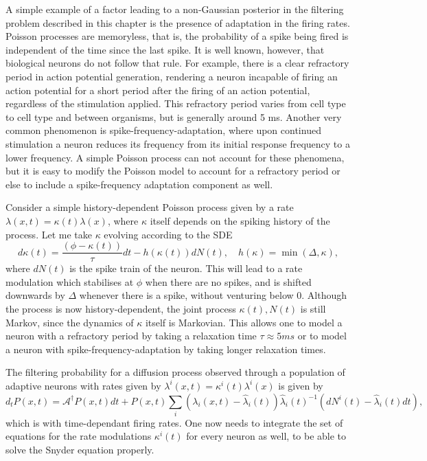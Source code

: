 {A simple example of a factor leading to a non-Gaussian posterior in the filtering problem described in this chapter is the presence of adaptation in the firing rates. Poisson processes 
are memoryless,
that is, the probability of a spike being fired is independent of the time since the last spike. It is well known, however, that biological neurons do not follow that rule. For example,
there is a clear refractory period in action potential generation, rendering a neuron incapable of firing an action potential for a short period after the firing of an action potential, 
regardless of the stimulation applied. This
refractory period varies from cell type to cell type and between organisms, but is generally around 5 ms. Another very common phenomenon is
spike-frequency-adaptation, where upon continued stimulation a neuron reduces its frequency from its initial response frequency to a lower frequency.
A simple Poisson process can not account for these phenomena, but it is easy to modify the Poisson model to account for a refractory period or else to include a spike-frequency 
adaptation component as well.
\par

Consider a simple history-dependent Poisson process given by a rate $\lambda(x,t) = \kappa(t) \lambda(x)$, where $\kappa$ itself depends on the
spiking history of the process. Let me take $\kappa$ evolving according to the SDE
\[
d\kappa(t) = \frac{(\phi - \kappa(t))}{\tau} dt - h(\kappa(t)) dN(t), \quad h(\kappa) = \min(\Delta, \kappa),
\]
where $dN(t)$ is the spike train of the neuron.
This will lead to a rate modulation which stabilises at $\phi$ when there are no spikes, and is shifted downwards by $\Delta$ whenever there is a spike, without
venturing below 0. Although the process is now history-dependent, the joint process $\kappa(t),N(t)$ is still Markov, since the dynamics of $\kappa$ itself
is Markovian. This allows one to model a neuron with a refractory period by taking a relaxation time $\tau \approx 5 ms$ or to model a neuron with spike-frequency-adaptation by taking longer relaxation times.\par

The filtering probability for a diffusion process observed through a population of adaptive neurons with rates given by $\lambda^i(x,t) = \kappa^i(t) \lambda^i(x)$ is given by
\begin{equation}
\label{eq:snyder_adf}
d_t P(x,t) = \mathcal{A}^\dagger P(x,t) dt + P(x,t)\sum_i\left(\lambda_i(x,t)-\hat{\lambda}_i(t)\right)\hat{\lambda}_i(t)^{-1}\left(dN^i(t)-\hat{\lambda}_i(t) dt\right),
\end{equation}
which is  with time-dependant firing rates. One now needs to integrate the set of equations for the rate modulations $\kappa^i(t)$ for every neuron as well, to be 
able to solve the Snyder equation properly.
\par

}
